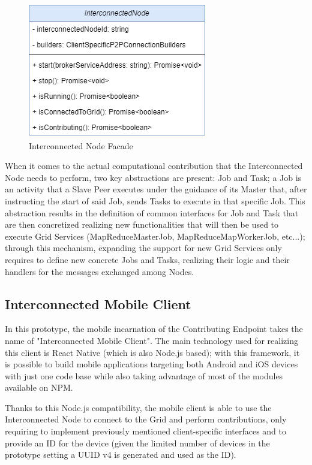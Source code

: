 \begin{figure}[!ht]
    \centering
    \includegraphics[scale=0.6]{document/chapters/chapter_7/images/interconnected_node_facade.png}
    \caption{Interconnected Node Facade}
    \label{fig:interconnected_node_facade}
\end{figure}

When it comes to the actual computational contribution that the Interconnected Node needs to perform, two key abstractions are present: Job and Task; a Job is an activity that a Slave Peer executes under the guidance of its Master that, after instructing the start of said Job, sends Tasks to execute in that specific Job. This abstraction results in the definition of common interfaces for Job and Task that are then concretized realizing new functionalities that will then be used to execute Grid Services (MapReduceMasterJob, MapReduceMapWorkerJob, etc...); through this mechanism, expanding the support for new Grid Services only requires to define new concrete Jobs and Tasks, realizing their logic and their handlers for the messages exchanged among Nodes.

\subsection{Interconnected Mobile Client}
In this prototype, the mobile incarnation of the Contributing Endpoint takes the name of "Interconnected Mobile Client". The main technology used for realizing this client is React Native (which is also Node.js based); with this framework, it is possible to build mobile applications targeting both Android and iOS devices with just one code base while also taking advantage of most of the modules available on NPM.

Thanks to this Node.js compatibility, the mobile client is able to use the Interconnected Node to connect to the Grid and perform contributions, only requiring to implement previously mentioned client-specific interfaces and to provide an ID for the device (given the limited number of devices in the prototype setting a UUID v4 is generated and used as the ID).

